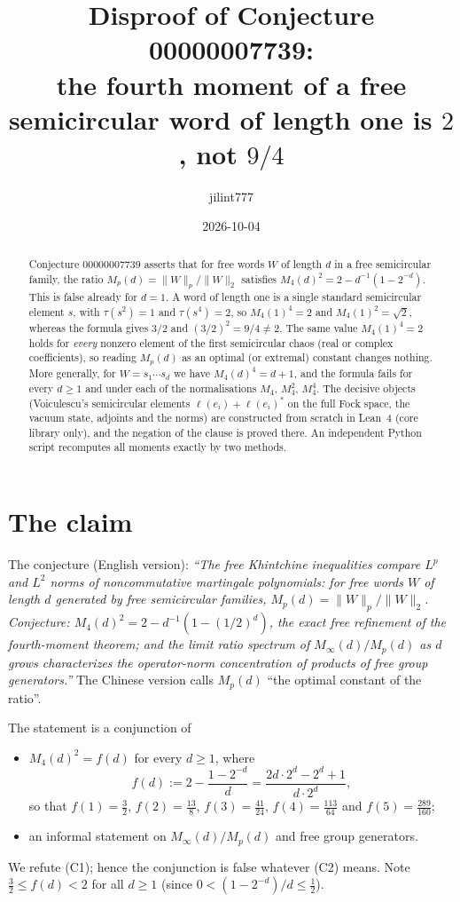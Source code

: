 \documentclass[11pt]{article}
\title{Disproof of Conjecture 00000007739:\\
the fourth moment of a free semicircular word of length one is $2$, not $9/4$}
\author{jilint777}
\date{2026-10-04}
\theoremstyle{definition}
\theoremstyle{remark}
\begin{document}
\sloppy
\maketitle

\begin{abstract}
Conjecture 00000007739 asserts that for free words $W$ of length $d$ in a free semicircular
family, the ratio $M_p(d)=\|W\|_p/\|W\|_2$ satisfies
$M_4(d)^2=2-d^{-1}(1-2^{-d})$. This is false already for $d=1$. A word of length one is a single
standard semicircular element $s$, with $\tau(s^2)=1$ and $\tau(s^4)=2$, so $M_4(1)^4=2$ and
$M_4(1)^2=\sqrt2$, whereas the formula gives $3/2$ and $(3/2)^2=9/4\ne2$. The same value
$M_4(1)^4=2$ holds for \emph{every} nonzero element of the first semicircular chaos (real or
complex coefficients), so reading $M_p(d)$ as an optimal (or extremal) constant changes nothing.
More generally, for $W=s_1\cdots s_d$ we have $M_4(d)^4=d+1$, and the formula fails for every
$d\ge1$ and under each of the normalisations $M_4$, $M_4^2$, $M_4^4$. The decisive objects
(Voiculescu's semicircular elements $\ell(e_i)+\ell(e_i)^*$ on the full Fock space, the vacuum
state, adjoints and the norms) are constructed from scratch in Lean~4 (core library only), and the
negation of the clause is proved there. An independent Python script recomputes all moments
exactly by two methods.
\end{abstract}

\section{The claim}

The conjecture (English version): \emph{``The free Khintchine inequalities compare $L^p$ and $L^2$
norms of noncommutative martingale polynomials: for free words $W$ of length $d$ generated by free
semicircular families, $M_p(d)=\|W\|_p/\|W\|_2$. Conjecture: $M_4(d)^2=2-d^{-1}(1-(1/2)^d)$, the
exact free refinement of the fourth-moment theorem; and the limit ratio spectrum of
$M_\infty(d)/M_p(d)$ as $d$ grows characterizes the operator-norm concentration of products of free
group generators.''} The Chinese version calls $M_p(d)$ ``the optimal constant of the ratio''.

The statement is a conjunction of
\begin{itemize}
\item[(C1)] $M_4(d)^2=f(d)$ for every $d\ge1$, where
\[
f(d):=2-\frac{1-2^{-d}}{d}=\frac{2d\cdot2^d-2^d+1}{d\cdot2^d},
\]
so that $f(1)=\tfrac32$, $f(2)=\tfrac{13}8$, $f(3)=\tfrac{41}{24}$, $f(4)=\tfrac{113}{64}$ and
$f(5)=\tfrac{289}{160}$;
\item[(C2)] an informal statement on $M_\infty(d)/M_p(d)$ and free group generators.
\end{itemize}
We refute (C1); hence the conjunction is false whatever (C2) means. Note $\tfrac32\le f(d)<2$ for
all $d\ge1$ (since $0<(1-2^{-d})/d\le\tfrac12$).
\end{document}
